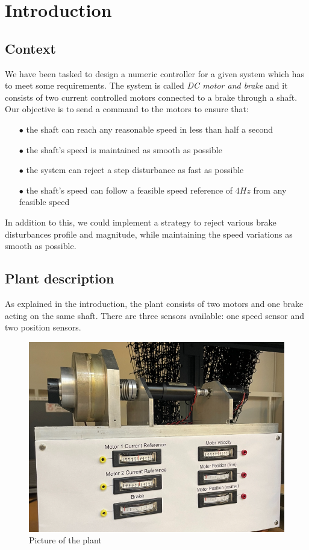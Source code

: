 \setcounter{secnumdepth}{-1}

\chapter{Introduction}

\section{Context}
\label{section:requirements}

We have been tasked to design a numeric controller for a given system which has to meet some requirements. The system is 
called \textit{DC motor and brake} and it consists of two current controlled motors connected to a brake through a shaft.\\
Our objective is to send a command to the motors to ensure that:

\begin{enumerate}
    \item[$\bullet$] the shaft can reach any reasonable speed in less than half a second
    \item[$\bullet$] the shaft's speed is maintained as smooth as possible
    \item[$\bullet$] the system can reject a step disturbance as fast as possible
    \item[$\bullet$] the shaft's speed can follow a feasible speed reference of $4 Hz$ from any feasible speed
\end{enumerate}

In addition to this, we could implement a strategy to reject various brake disturbances profile and magnitude, while 
maintaining the speed variations as smooth as possible.

\section{Plant description}

As explained in the introduction, the plant consists of two motors and one brake acting on the same shaft. There are 
three sensors available: one speed sensor and two position sensors.

\begin{figure}[H]
    \centering
    \includegraphics[height=\textheight/4]{Pictures/plant_picture.png}
    \caption{Picture of the plant}
\end{figure}


